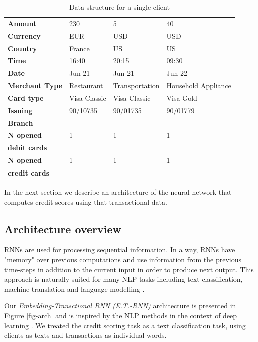 \documentclass[sigconf]{acmart}
\begin{document}
\begin{table}[ht]
\caption{Data structure for a single client}
\begin{tabular}{ | m{7em} |  m{5em} m{5em} m{5em}| }
\hline
\textbf{Amount} & 230 & 5 & 40 \\
\textbf{Currency} & EUR & USD & USD \\
\textbf{Country} & France & US & US \\
\textbf{Time} & 16:40 & 20:15 & 09:30 \\
\textbf{Date} & Jun 21 & Jun 21 & Jun 22 \\
\textbf{Merchant Type} & Restaurant & Transportation & Household Appliance \\
\textbf{Card type} & Visa Classic & Visa Classic & Visa Gold \\
\textbf{Issuing} & 90/10735 & 90/01735 & 90/01779 \\
\textbf{Branch} &&& \\
\textbf{N opened} & 1 & 1& 1 \\
\textbf{debit cards} &&& \\
\textbf{N opened} & 1 & 1& 1 \\
\textbf{credit cards} &&& \\
\hline
\end{tabular}
\label{tab-tr-data}
\end{table}

In the next section we describe an architecture of the neural network that computes credit scores using that transactional data.

\subsection{Architecture overview}

RNNs are used for processing sequential information.  In a way, RNNs have "memory" over previous computations and use information from the previous time-steps in addition to the current input in order to produce next output. This approach is naturally suited for many NLP tasks including text classification, machine translation and language modelling \cite{mikolov2010recurrent}.

Our \textit{Embedding-Transctional RNN (E.T.-RNN)} architecture is presented in Figure \ref{fig-arch} and is inspired by the NLP methods in the context of deep learning \cite{mikolov2010recurrent}. We treated the credit scoring task as a text classification task, using clients as texts and transactions as individual words.
\end{document}
